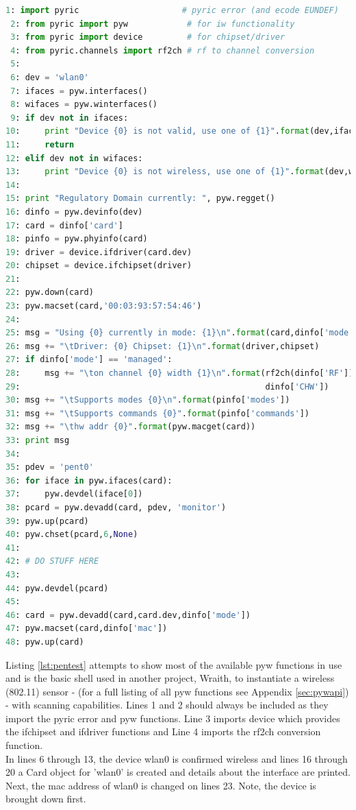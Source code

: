 \documentclass[11pt]{article}
\begin{document}
\begin{lstlisting}[caption={Setting up a Wireless Pentest Environment},
                   label={lst:pentest},
                   language=Python]
 1: import pyric                     # pyric error (and ecode EUNDEF)
 2: from pyric import pyw            # for iw functionality
 3: from pyric import device         # for chipset/driver
 4: from pyric.channels import rf2ch # rf to channel conversion
 5:
 6: dev = 'wlan0'
 7: ifaces = pyw.interfaces()
 8: wifaces = pyw.winterfaces()
 9: if dev not in ifaces:
10:     print "Device {0} is not valid, use one of {1}".format(dev,ifaces)
11:     return
12: elif dev not in wifaces:
13:     print "Device {0} is not wireless, use one of {1}".format(dev,wifaces)
14:
15: print "Regulatory Domain currently: ", pyw.regget()
16: dinfo = pyw.devinfo(dev)
17: card = dinfo['card']
18: pinfo = pyw.phyinfo(card)
19: driver = device.ifdriver(card.dev)
20: chipset = device.ifchipset(driver)
21:
22: pyw.down(card)
23: pyw.macset(card,'00:03:93:57:54:46')
24:
25: msg = "Using {0} currently in mode: {1}\n".format(card,dinfo['mode'])
26: msg += "\tDriver: {0} Chipset: {1}\n".format(driver,chipset)
27: if dinfo['mode'] == 'managed':
28:     msg += "\ton channel {0} width {1}\n".format(rf2ch(dinfo['RF']),
29:                                                  dinfo['CHW'])
30: msg += "\tSupports modes {0}\n".format(pinfo['modes'])
31: msg += "\tSupports commands {0}".format(pinfo['commands'])
32: msg += "\thw addr {0}".format(pyw.macget(card))
33: print msg
34:
35: pdev = 'pent0'
36: for iface in pyw.ifaces(card):
37:     pyw.devdel(iface[0])
38: pcard = pyw.devadd(card, pdev, 'monitor')
39: pyw.up(pcard)
40: pyw.chset(pcard,6,None)
41: 
42: # DO STUFF HERE 
43:
44: pyw.devdel(pcard)
45:
46: card = pyw.devadd(card,card.dev,dinfo['mode'])
47: pyw.macset(card,dinfo['mac'])
48: pyw.up(card)
\end{lstlisting}

Listing \ref{lst:pentest} attempts to show most of the available pyw functions 
in use and is the basic shell used in another project, Wraith\cite{wraith}, to 
instantiate a wireless (802.11) sensor - (for a full listing of all pyw functions
see Appendix \ref{sec:pywapi}) - with scanning capabilities. Lines 1 and 2 should 
always be included as they import the pyric error and pyw functions. Line 3 
imports device which provides the ifchipset and ifdriver functions and Line 4 
imports the rf2ch conversion function. \\

In lines 6 through 13, the device wlan0 is confirmed wireless and lines 16 through
20 a Card object for 'wlan0' is created and details about the interface are printed. 
Next, the mac address of wlan0 is changed on lines 23. Note, the device is brought
down first. \\
\end{document}
